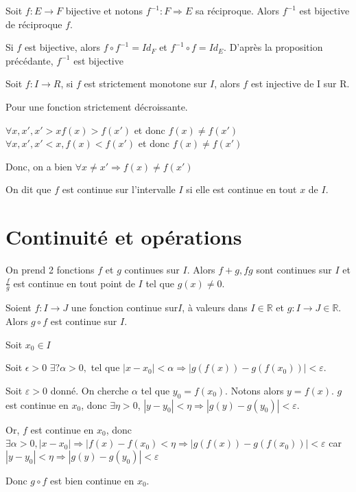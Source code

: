 \documentclass[french]{yLectureNote}
\begin{document}
\begin{theorem}[Proposition]
Soit $f : E\rightarrow F$ bijective et notons $f^{-1} : F\Rightarrow E$ sa réciproque. Alors $f^{-1}$ est bijective de réciproque $f$.
\end{theorem}
\begin{myproof}[]
Si $f$ est bijective, alors $f\circ f^{-1} = Id_F$ et $f^{-1}\circ f = Id_E$. D'après la proposition précédante, $f^{-1}$ est bijective

\end{myproof}

\begin{theorem}[Proposition]
Soit $f : I\rightarrow R$, si $f$ est strictement monotone sur $I$, alors $f$ est injective de I sur R.
\end{theorem}
\begin{myproof}
Pour une fonction strictement décroissante.

$\forall x,x', x'>x f(x)>f(x')$ et donc $f(x)\neq f(x')$
$\forall x,x',x'<x, f(x)<f(x')$ et donc $f(x)\neq f(x')$

Donc, on a bien $\forall x\neq x' \Rightarrow f(x)\neq f(x')$
\end{myproof}



On dit que $f$ est continue sur l'intervalle $I$ si elle est continue en tout $x$ de $I$.
\section{Continuité et opérations}
On prend 2 fonctions $f$ et $g$ continues sur $I$. Alors $f+g, fg$ sont continues sur $I$ et $\frac{f}{g}$ est continue en tout point de $I$ tel que $g(x)\neq 0$.

\begin{theorem}
Soient $f : I\to J$ une fonction continue sur$I$, à valeurs dans $I\in\mathbb{R}$ et $g:I\to J\in\mathbb{R}$. Alors $g\circ f$ est continue sur $I$.
\end{theorem}
\begin{myproof}
Soit $x_0\in I$

Soit $\epsilon >0$ $\exists ? \alpha >0,$ tel que $|x-x_0| < \alpha \Rightarrow |g(f(x)) - g(f(x_0))|<\varepsilon$.

Soit $\varepsilon >0$ donné. On cherche $\alpha$ tel que $y_0 = f(x_0)$. Notons alors $y=f(x)$. $g$ est continue en $x_0$, donc $\exists \eta >0$, $|y-y_0|<\eta \Rightarrow |g(y)-g(y_0)|<\varepsilon$.

Or, $f$ est continue en $x_0$, donc $\exists \alpha >0, |x-x_0| \Rightarrow |f(x)-f(x_0) < \eta \Rightarrow |g(f(x))-g(f(x_0))| < \varepsilon$ car $|y-y_0|<\eta \Rightarrow |g(y)-g(y_0)|<\varepsilon$

Donc $g\circ f$ est bien continue en $x_0$.
\end{myproof}
\end{document}
